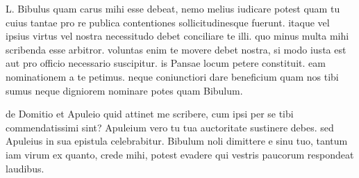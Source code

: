 


 L. Bibulus quam carus mihi esse debeat, nemo melius iudicare potest quam tu cuius tantae pro re publica contentiones sollicitudinesque fuerunt. itaque vel ipsius virtus vel nostra necessitudo debet conciliare te illi. quo minus multa mihi scribenda esse arbitror. voluntas enim te movere debet nostra, si modo iusta est aut pro officio necessario suscipitur. is Pansae locum petere constituit. eam nominationem a te petimus. neque coniunctiori dare beneficium quam nos tibi sumus neque digniorem nominare potes quam Bibulum.

 de Domitio et Apuleio quid attinet me scribere, cum ipsi per se tibi commendatissimi sint? Apuleium vero tu tua auctoritate sustinere debes. sed Apuleius in sua epistula celebrabitur. Bibulum noli dimittere e sinu tuo, tantum iam virum ex quanto, crede mihi, potest evadere qui vestris paucorum respondeat laudibus.
